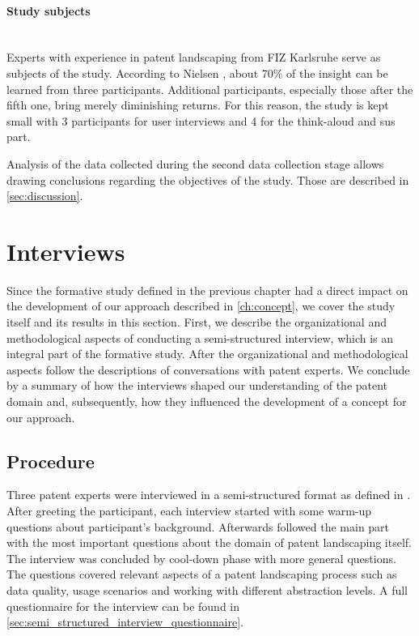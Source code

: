 \paragraph{Study subjects}~\\
Experts with experience in patent landscaping from FIZ Karlsruhe serve as subjects of the study. 
According to Nielsen \cite{Nielsen2000}, about 70\% of the insight can be learned from three participants.
Additional participants, especially those after the fifth one, bring merely diminishing returns. 
For this reason, the study is kept small with 3 participants for user interviews and 4 for the think-aloud and \gls{sus} part.

Analysis of the data collected during the second data collection stage allows drawing conclusions regarding the objectives of the study.
Those are described in \autoref{sec:discussion}.

\section{Interviews}
\label{sec:interviews}

Since the formative study defined in the previous chapter had a direct impact on the development of our approach described in \autoref{ch:concept}, we cover the study itself and its results in this section.
First, we describe the organizational and methodological aspects of conducting a semi-structured interview, which is an integral part of the formative study.
After the organizational and methodological aspects follow the descriptions of conversations with patent experts.
We conclude by a summary of how the interviews shaped our understanding of the patent domain and, subsequently, how they influenced the development of a concept for our approach.

\subsection{Procedure}
\label{subsec:procedure}

Three patent experts were interviewed in a semi-structured format as defined in \cite{robson2002real}. 
After greeting the participant, each interview started with some warm-up questions about participant's background. 
Afterwards followed the main part with the most important questions about the domain of patent landscaping itself.
The interview was concluded by cool-down phase with more general questions.
The questions covered relevant aspects of a patent landscaping process such as data quality, usage scenarios and working with different abstraction levels.
A full questionnaire for the interview can be found in \autoref{sec:semi_structured_interview_questionnaire}.


